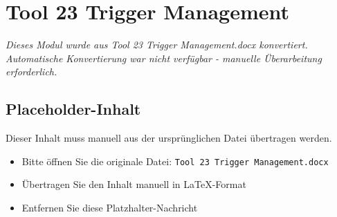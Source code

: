
\section{Tool 23 Trigger Management}
\label{sec:tool-23-trigger-management}

\begin{center}
\textit{Dieses Modul wurde aus Tool 23 Trigger Management.docx konvertiert.\\
Automatische Konvertierung war nicht verfügbar - manuelle Überarbeitung erforderlich.}
\end{center}


\subsection{Placeholder-Inhalt}

Dieser Inhalt muss manuell aus der ursprünglichen Datei übertragen werden.

\begin{itemize}
\item Bitte öffnen Sie die originale Datei: \texttt{Tool 23 Trigger Management.docx}
\item Übertragen Sie den Inhalt manuell in LaTeX-Format
\item Entfernen Sie diese Platzhalter-Nachricht
\end{itemize}
